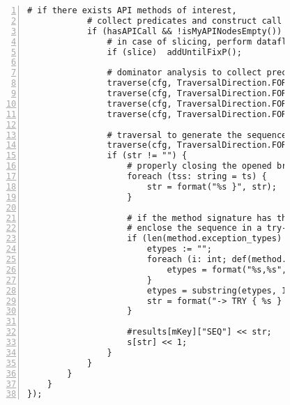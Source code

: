 \begin{figure}[ht!]
\begin{lstlisting}[numbers=left, tabsize=4, escapechar=@, caption={API Usage Mining Analysis},label={lst:aun-code}, lastline = 10]
            # if there exists API methods of interest, 
            # collect predicates and construct call sequences
		    if (hasAPICall && !isMyAPINodesEmpty()) {
		        # in case of slicing, perform dataflow slicing to capture dependencies
		        if (slice)  addUntilFixP();
		        
		        # dominator analysis to collect preconditions
		        traverse(cfg, TraversalDirection.FORWARD, TraversalKind.SHALLOW_ITERATIVE, allnode_ids);
			    traverse(cfg, TraversalDirection.FORWARD, TraversalKind.HYBRID, cfg_dom, fixp_dom);
			    traverse(cfg, TraversalDirection.FORWARD, TraversalKind.SHALLOW_ITERATIVE, dom_result);
			    traverse(cfg, TraversalDirection.FORWARD, TraversalKind.SHALLOW_ITERATIVE, dom_more);
                
                # traversal to generate the sequence
		        traverse(cfg, TraversalDirection.FORWARD, TraversalKind.SHALLOW_ITERATIVE, seqGen);
    			if (str != "") {
    			    # properly closing the opened braces in the sequence
    				foreach (tss: string = ts) {
    					str = format("%s }", str);
    				}
    				
    				# if the method signature has throws exceptions,
    				# enclose the sequence in a try-catch
    				if (len(method.exception_types) > 0) {
    				    etypes := "";
    				    foreach (i: int; def(method.exception_types[i])) {
    				        etypes = format("%s,%s", etypes, method.exception_types[i].name);
    				    }
    				    etypes = substring(etypes, 1);
    				    str = format("-> TRY { %s } CATCH(%s) {}", str, etypes);
    				}
    				    
    				#results[mKey]["SEQ"] << str; 
    				s[str] << 1; 
    			}
		    }
		}
	}
});
\end{lstlisting}
\end{figure}